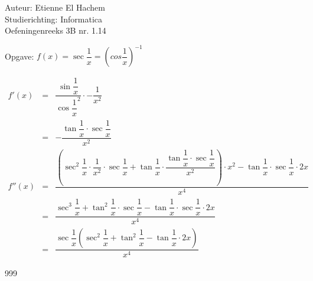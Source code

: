 \documentclass[a4paper]{article}
\begin{document}
  
\noindent \large Auteur: Etienne El Hachem \\
\noindent \large Studierichting: Informatica\\
\noindent \large Oefeningenreeks 3B nr. 1.14\\

\medskip

\normalsize

Opgave: $f(x) = \sec \dfrac{1}{x} = \left(cos \dfrac{1}{x}\right)^{-1}$

\begin{eqnarray*}
f'(x) &=& \dfrac{\sin \dfrac{1}{x}}{{\cos \dfrac{1}{x}}^2} \cdot -\dfrac{1}{x^2} \\
			&=& -\dfrac{\tan\dfrac{1}{x}\cdot\sec\dfrac{1}{x}}{x^2} \\
f''(x) &=& \dfrac{(\sec^2\dfrac{1}{x}\cdot\dfrac{1}{x^2}\cdot\sec\dfrac{1}{x}+\tan\dfrac{1}{x}\cdot\dfrac{\tan\dfrac{1}{x}\cdot\sec\dfrac{1}{x}}{x^2})\cdot x^2 - \tan\dfrac{1}{x}\cdot\sec\dfrac{1}{x}\cdot 2x}{x^4} \\
			 &=& \dfrac{\sec^3\dfrac{1}{x}+\tan^2\dfrac{1}{x}\cdot\sec\dfrac{1}{x} - \tan\dfrac{1}{x}\cdot\sec\dfrac{1}{x}\cdot 2x}{x^4} \\
			 &=& \dfrac{\sec\dfrac{1}{x}\left(\sec^2\dfrac{1}{x}+\tan^2\dfrac{1}{x}-\tan\dfrac{1}{x}\cdot 2x\right)}{x^4}
\end{eqnarray*}

\begin{thebibliography}{999}
\end{thebibliography}
\end{document}
